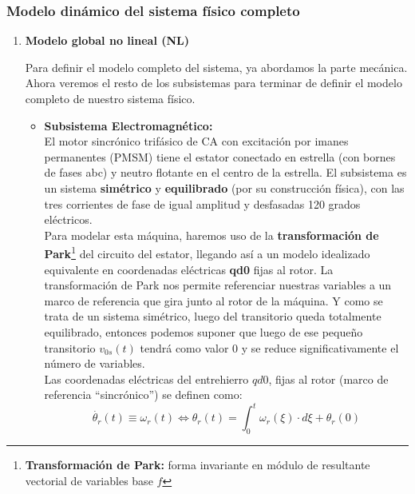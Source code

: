 \documentclass[10pt]{article}
\begin{document}
\subsubsection{Modelo dinámico del sistema físico completo}

\begin{enumerate}
    \renewcommand{\theenumi}{\alph{enumi}} %
    \item \textbf{Modelo global no lineal (NL)}
    
    Para definir el modelo completo del sistema, ya abordamos la parte mecánica. Ahora veremos el resto de los subsistemas para terminar de definir el modelo completo de nuestro sistema físico.
	\begin{itemize}
		\item \textbf{Subsistema Electromagnético:}\vspace{0.3cm}\\
		El motor sincrónico trifásico de CA con excitación por imanes permanentes (PMSM) tiene el estator conectado en estrella (con bornes de fases abc) y neutro flotante en el centro de la estrella.
		El subsistema es un sistema \textbf{simétrico} y \textbf{equilibrado} (por su construcción física), con las tres corrientes de fase de igual amplitud y desfasadas 120 grados eléctricos.
		\vspace{0.3cm}\\
		Para modelar esta máquina, haremos uso de la \textbf{transformación de Park}\footnote[1]{\textbf{Transformación de Park:} forma invariante en módulo de resultante vectorial de variables base $f$} del circuito del estator, llegando así a un modelo idealizado equivalente en coordenadas eléctricas \textbf{qd0} fijas al rotor.
		La transformación de Park nos permite referenciar nuestras variables a un marco de referencia que gira junto al rotor de la máquina.
		Y como se trata de un sistema simétrico, luego del transitorio queda totalmente equilibrado, entonces podemos suponer que luego de ese pequeño transitorio $v_{0s}(t)$ tendrá como valor $0$ y se reduce significativamente el número de variables.
		\vspace{0.3cm}\\
		Las coordenadas eléctricas del entrehierro $qd0$, fijas al rotor (marco de referencia “sincrónico”) se definen como:
		\begin{equation}
			\dot{\theta_{r}}\left ( t \right )\equiv \omega_{r}\left ( t \right )\Leftrightarrow \theta_{r}\left ( t \right )=\int_{0}^{t}\omega_{r}\left ( \xi \right )\cdot d\xi + \theta_{r}\left ( 0 \right )

\end{equation}
\end{itemize}
\end{enumerate}
\end{document}
